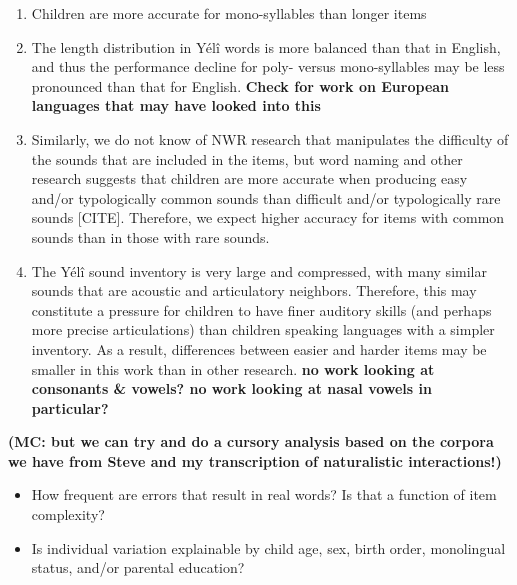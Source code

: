 \documentclass[english,,man,floatsintext]{apa6}
\providecommand{\tightlist}{%
  \setlength{\itemsep}{0pt}\setlength{\parskip}{0pt}}
\begin{document}
\begin{enumerate}
\def\labelenumi{\arabic{enumi}.}
\item
  Children are more accurate for mono-syllables than longer items
\item
  The length distribution in Yélî words is more balanced than that in English, and thus the performance decline for poly- versus mono-syllables may be less pronounced than that for English. \textbf{Check for work on European languages that may have looked into this}
\item
  Similarly, we do not know of NWR research that manipulates the difficulty of the sounds that are included in the items, but word naming and other research suggests that children are more accurate when producing easy and/or typologically common sounds than difficult and/or typologically rare sounds {[}CITE{]}. Therefore, we expect higher accuracy for items with common sounds than in those with rare sounds.
\item
  The Yélî sound inventory is very large and compressed, with many similar sounds that are acoustic and articulatory neighbors. Therefore, this may constitute a pressure for children to have finer auditory skills (and perhaps more precise articulations) than children speaking languages with a simpler inventory. As a result, differences between easier and harder items may be smaller in this work than in other research. \textbf{no work looking at consonants \& vowels? no work looking at nasal vowels in particular?}
\end{enumerate}

\textbf{(MC: but we can try and do a cursory analysis based on the corpora we have from Steve and my transcription of naturalistic interactions!)}

\begin{itemize}
\tightlist
\item
  How frequent are errors that result in real words? Is that a function of item complexity?
\item
  Is individual variation explainable by child age, sex, birth order, monolingual status, and/or parental education?
\end{itemize}
\end{document}
